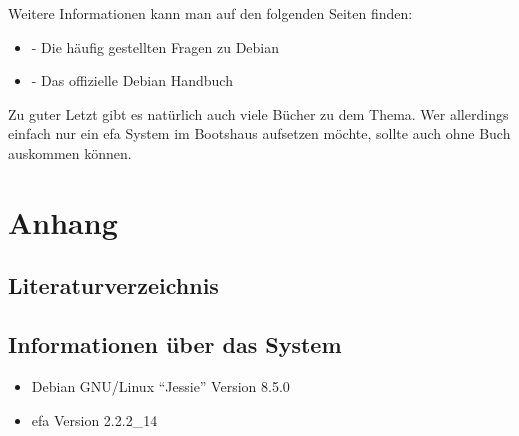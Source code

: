 \documentclass[a4paper,12pt,twoside]{article}
\begin{document}
Weitere Informationen kann man auf den folgenden Seiten finden:

\begin{itemize}
    \item \cite{HLP2} - Die häufig gestellten Fragen zu Debian
    \item \cite{HLP3} - Das offizielle Debian Handbuch
\end{itemize}

Zu guter Letzt gibt es natürlich auch viele Bücher zu dem Thema. Wer
allerdings einfach nur ein efa System im Bootshaus aufsetzen möchte,
sollte auch ohne Buch auskommen können.


\clearpage
\section{Anhang}
\label{sct:anhang}
\subsection{Literaturverzeichnis}
\label{sct:literatur}




\subsection{Informationen über das System}
\label{sct:sysinfo}

\begin{itemize}
    \item Debian GNU/Linux "`Jessie"' Version 8.5.0
    \item efa Version 2.2.2\_14
\end{itemize}
\end{document}
